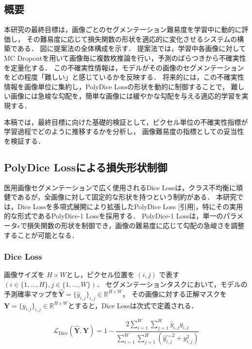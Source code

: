 \documentclass[10pt, a4paper, twocolumn]{jarticle}
\begin{document}
\subsection{概要}
本研究の最終目標は，画像ごとのセグメンテーション難易度を学習中に動的に評価し，
その難易度に応じて損失関数の形状を適応的に変化させるシステムの構築である．
図に提案法の全体構成を示す．
提案法では，学習中各画像に対してMC Dropoutを用いて画像毎に複数枚推論を行い，予測のばらつきから不確実性を定量化する．
この不確実性情報は，モデルがその画像のセグメンテーションをどの程度「難しい」と感じているかを反映する．
将来的には，この不確実性情報を画像単位に集約し，PolyDice Lossの形状を動的に制御することで，
難しい画像には急峻な勾配を，簡単な画像には緩やかな勾配を与える適応的学習を実現する．

本稿では，最終目標に向けた基礎的検証として，ピクセル単位の不確実性指標が学習過程でどのように推移するかを分析し，
画像難易度の指標としての妥当性を検証する．

\subsection{PolyDice Loss\cite{polydice}による損失形状制御}
医用画像セグメンテーションで広く使用されるDice Lossは，クラス不均衡に頑健であるが，全画像に対して固定的な形状を持つという制約がある．
本研究では，Dice Lossを多項式展開により拡張したPolyDice Loss [引用]，特にその実用的な形式であるPolyDice-1 Lossを採用する．
PolyDice-1 Lossは，単一のパラメータ$\epsilon$で損失関数の形状を制御でき，画像の難易度に応じて勾配の急峻さを調整することが可能となる．

\subsubsection{Dice Loss}
画像サイズを $H \times W$とし，ピクセル位置を $(i, j)$ で表す$\left(i \in \{1, ..., H\}, j \in \{1, ..., W\}\right)$．
セグメンテーションタスクにおいて，モデルの予測確率マップを$\hat{\mathbf{Y}} = \{\hat{y}_{i,j}\}_{i,j} \in \mathbb R ^ {H \times W}$，
その画像に対する正解マスクを$\mathbf{Y} = \{{y}_{i,j}\}_{i,j} \in \mathbb R ^ {H \times W}$とすると，Dice Lossは次式で定義される．

\begin{equation}
  \mathcal{L}_{\text{Dice}}(\hat{\mathbf{Y}}, \mathbf{Y}) = 1 - \frac{2 \sum_{i=1}^{W} \sum_{j=1}^{H} \hat{y}_{i, j} y_{i, j}}{\sum_{i=1}^{W} \sum_{j=1}^{H}(\hat{y_{i, j}} ^ 2 + y_{i, j} ^ 2)}
\end{equation}
\end{document}
